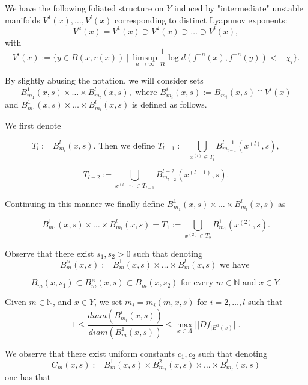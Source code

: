 \documentclass{amsart}
\theoremstyle{plain}
\theoremstyle{definition}
\theoremstyle{remark}
\numberwithin{equation}{section}
\begin{document}
We have the following foliated structure on $Y$ induced by "intermediate" unstable manifolds $V^1(x), \ldots, V^l(x)$ corresponding to distinct Lyapunov exponents:
$$ V^u(x)= V^1(x)  \supset  V^2(x)  \supset  \ldots  \supset   V^l(x),$$
with
$$  V^i(x):=  \{   y\in B(x, r(x)) ~ | ~    \limsup_{n\to \infty}  \frac{1}{n}  \log   d(f^{-n}(x), f^{-n}(y))   < - \chi_i  \}.   $$

By slightly abusing the notation, we will consider sets
$$  B^1_{m_1}(x,s) \times   \ldots \times B^l_{m_l}(x,s),    
\text{ where } B^i_{m_i}(x,s):= B_{m_i}(x,s)\cap V^i(x)$$
and $  B^1_{m_1}(x,s) \times   \ldots \times B^l_{m_l}(x,s)$ is defined as follows. 

We first denote

$$  T_l :=      B^l_{m_l}(x,s).  \text{ Then we define }  T_{l-1}:=   \bigcup_{x^{(l)}  \in T_l }        B^{l-1}_{m_{l-1}}(   x^{(l)},  s),    $$

$$ T_{l-2}:=   \bigcup_{x^{(l-1)}  \in T_{l-1} }        B^{l-2}_{m_{l-2}}(   x^{(l-1)},  s).    $$

Continuing in this manner we finally define $  B^1_{m_1}(x,s) \times   \ldots \times B^l_{m_l}(x,s)$ as

\begin{equation}\label{def:prod}
 B^1_{m_1}(x,s) \times   \ldots \times B^l_{m_l}(x,s)=  T_{1}:=   \bigcup_{x^{(2)}  \in T_{2} }        B^{1}_{m_{1}}(   x^{(2)},  s).       
\end{equation}



Observe that there exist $s_1, s_2>0$ such that denoting $$B^{\times}_m(x,s):=   B^1_{m}(x,s) \times   \ldots \times B^l_{m}(x,s) \text{  we have } $$

\begin{equation}\label{eqn:bx-relation}
             B_m(x, s_1)   \subset   B^{\times}_m(x,s)   \subset  B_m(x,s_2)      \text{  for every $m\in\mathbb{N}$ and $x\in Y$} .            
\end{equation}




Given $m\in\mathbb{N}$, and $x\in Y$, we set $m_i=m_i(m,x,s)$ for $i=2, \ldots, l$ such that 
\begin{equation}\label{eqn:diam}
  1   \leq  \frac{diam(      B^i_{m_i}(x,s)      )}{diam(    B^1_m(x,s)    )}  \leq     \max_{x\in \Lambda} || Df_{|E^u(x)}||.
\end{equation}

We observe that there exist uniform constants $c_1, c_2$ such that denoting $$C_m(x,s):=  B^1_{m}(x,s) \times  B^2_{m_2}(x,s) \times \ldots \times B^l_{m_l}(x,s)$$ one has that
\end{document}
